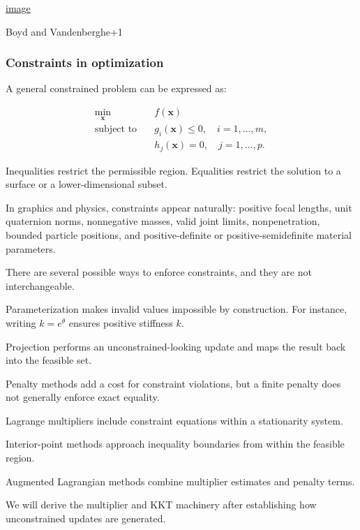 \href{https://www.google.com/s2/favicons?domain=https://stanford.edu&sz=32}{image}

Boyd and Vandenberghe+1

\subsubsection{Constraints in optimization}\label{02-foundations-ii-ch026-constraints-in-optimization}

\hypertarget{02-foundations-ii-ch026-constraints-in-optimization}{}

A general constrained problem can be expressed as:

\[
\begin{aligned} \min_{\mathbf x}\quad &f(\mathbf x)\\ \text{subject to}\quad &g_i(\mathbf x)\le0,\quad i=1,\ldots,m,\\ &h_j(\mathbf x)=0,\quad j=1,\ldots,p. \end{aligned}
\]

Inequalities restrict the permissible region. Equalities restrict the solution to a surface or a lower-dimensional subset.

In graphics and physics, constraints appear naturally: positive focal lengths, unit quaternion norms, nonnegative masses, valid joint limits, nonpenetration, bounded particle positions, and positive-definite or positive-semidefinite material parameters.

There are several possible ways to enforce constraints, and they are not interchangeable.

Parameterization makes invalid values impossible by construction. For instance, writing \(k=e^\theta\) ensures positive stiffness \(k\).

Projection performs an unconstrained-looking update and maps the result back into the feasible set.

Penalty methods add a cost for constraint violations, but a finite penalty does not generally enforce exact equality.

Lagrange multipliers include constraint equations within a stationarity system.

Interior-point methods approach inequality boundaries from within the feasible region.

Augmented Lagrangian methods combine multiplier estimates and penalty terms.

We will derive the multiplier and KKT machinery after establishing how unconstrained updates are generated.


